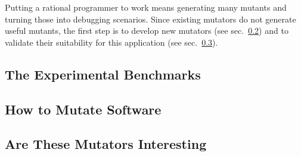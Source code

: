 
Putting a rational programmer to work means generating many mutants and turning
those into debugging scenarios. Since existing mutators do not generate useful
mutants, the first step is to develop new mutators (see sec.~\ref{sub:mutate-mutators})
and to validate their suitability for this application (see sec.~\ref{sub:mutate-interesting}).


\def\sub#1#2{\subsection{#2} \label{sub:mutate-#1} }


\sub{benchmarks}{The Experimental Benchmarks}

\sub{mutators}   {How to Mutate Software} 
\sub{interesting}{Are These Mutators Interesting} 
